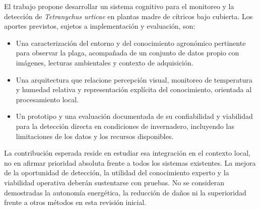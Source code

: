 El trabajo propone desarrollar un sistema cognitivo para el monitoreo y la
detección de \textit{Tetranychus urticae} en plantas madre de cítricos bajo
cubierta. Los aportes previstos, sujetos a implementación y evaluación, son:
\begin{itemize}
    \item Una caracterización del entorno y del conocimiento agronómico
    pertinente para observar la plaga, acompañada de un conjunto de datos
    propio con imágenes, lecturas ambientales y contexto de adquisición.
    \item Una arquitectura que relacione percepción visual, monitoreo de
    temperatura y humedad relativa y representación explícita del
    conocimiento, orientada al procesamiento local.
    \item Un prototipo y una evaluación documentada de su confiabilidad y
    viabilidad para la detección directa en condiciones de invernadero,
    incluyendo las limitaciones de los datos y los recursos disponibles.
\end{itemize}

La contribución esperada reside en estudiar esa integración en el contexto
local, no en afirmar prioridad absoluta frente a todos los sistemas existentes.
La mejora de la oportunidad de detección, la utilidad del conocimiento experto
y la viabilidad operativa deberán sustentarse con pruebas. No se consideran
demostradas la autonomía energética, la reducción de daños ni la superioridad
frente a otros métodos en esta revisión inicial.
